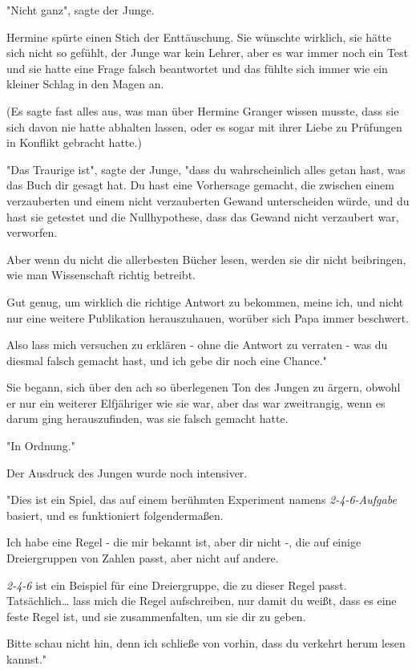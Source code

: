{"Nicht ganz", sagte der Junge.

Hermine spürte einen Stich der Enttäuschung. Sie wünschte wirklich, sie hätte sich nicht so gefühlt, der Junge war kein Lehrer, aber es war immer noch ein Test und sie hatte eine Frage falsch beantwortet und das fühlte sich immer wie ein kleiner Schlag in den Magen an.

(Es sagte fast alles aus, was man über Hermine Granger wissen musste, dass sie sich davon nie hatte abhalten lassen, oder es sogar mit ihrer Liebe zu Prüfungen in Konflikt gebracht hatte.)

"Das Traurige ist", sagte der Junge, "dass du wahrscheinlich alles getan hast, was das Buch dir gesagt hat. Du hast eine Vorhersage gemacht, die zwischen einem verzauberten und einem nicht verzauberten Gewand unterscheiden würde, und du hast sie getestet und die Nullhypothese, dass das Gewand nicht verzaubert war, verworfen.

Aber wenn du nicht die allerbesten Bücher lesen, werden sie dir nicht beibringen, wie man Wissenschaft richtig betreibt.

Gut genug, um wirklich die richtige Antwort zu bekommen, meine ich, und nicht nur eine weitere Publikation herauszuhauen, worüber sich Papa immer beschwert.

Also lass mich versuchen zu erklären - ohne die Antwort zu verraten - was du diesmal falsch gemacht hast, und ich gebe dir noch eine Chance."

Sie begann, sich über den ach so überlegenen Ton des Jungen zu ärgern, obwohl er nur ein weiterer Elfjähriger wie sie war, aber das war zweitrangig, wenn es darum ging herauszufinden, was sie falsch gemacht hatte.

"In Ordnung."

Der Ausdruck des Jungen wurde noch intensiver.

"Dies ist ein Spiel, das auf einem berühmten Experiment namens \emph{2-4-6-Aufgabe} basiert, und es funktioniert folgendermaßen.

Ich habe eine Regel - die mir bekannt ist, aber dir nicht -, die auf einige Dreiergruppen von Zahlen passt, aber nicht auf andere.

\emph{2-4-6} ist ein Beispiel für eine Dreiergruppe, die zu dieser Regel passt. Tatsächlich… lass mich die Regel aufschreiben, nur damit du weißt, dass es eine feste Regel ist, und sie zusammenfalten, um sie dir zu geben.

Bitte schau nicht hin, denn ich schließe von vorhin, dass du verkehrt herum lesen kannst."

}
